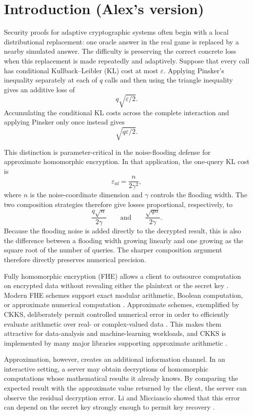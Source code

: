 \section{Introduction (Alex's version)}
\label{sec:introduction-alex}



Security proofs for adaptive cryptographic systems often begin with a local distributional replacement: one oracle answer in the real game is replaced by a nearby simulated answer. The difficulty is preserving the correct concrete loss when this replacement is made repeatedly and adaptively. Suppose that every call has conditional Kullback--Leibler (KL) cost at most $\varepsilon$. Applying Pinsker's inequality separately at each of $q$ calls and then using the triangle inequality gives an additive loss of
\[
q\sqrt{\varepsilon/2}.
\]
Accumulating the conditional KL costs across the complete interaction and applying Pinsker only once instead gives
\[
\sqrt{q\varepsilon/2}.
\]

This distinction is parameter-critical in the noise-flooding defense for approximate homomorphic encryption. In that application, the one-query KL cost is
\[
\varepsilon_{\mathrm{nf}}=\frac{n}{2\gamma^{2}},
\]
where $n$ is the noise-coordinate dimension and $\gamma$ controls the flooding width. The two composition strategies therefore give losses proportional, respectively, to
\[
\frac{q\sqrt{n}}{2\gamma}
\qquad\text{and}\qquad
\frac{\sqrt{qn}}{2\gamma}.
\]
Because the flooding noise is added directly to the decrypted result, this is also the difference between a flooding width growing linearly and one growing as the square root of the number of queries. The sharper composition argument therefore directly preserves numerical precision.

Fully homomorphic encryption (FHE) allows a client to outsource computation on encrypted data without revealing either the plaintext or the secret key \cite{rad78,gentry09}. Modern FHE schemes support exact modular arithmetic, Boolean computation, or approximate numerical computation \cite{fv12,tfhe,ckks}. Approximate schemes, exemplified by CKKS, deliberately permit controlled numerical error in order to efficiently evaluate arithmetic over real- or complex-valued data \cite{ckks}. This makes them attractive for data-analysis and machine-learning workloads, and CKKS is implemented by many major libraries supporting approximate arithmetic \cite{heprofiler}.

Approximation, however, creates an additional information channel. In an interactive setting, a server may obtain decryptions of homomorphic computations whose mathematical results it already knows. By comparing the expected result with the approximate value returned by the client, the server can observe the residual decryption error. Li and Micciancio showed that this error can depend on the secret key strongly enough to permit key recovery \cite{lm}.

